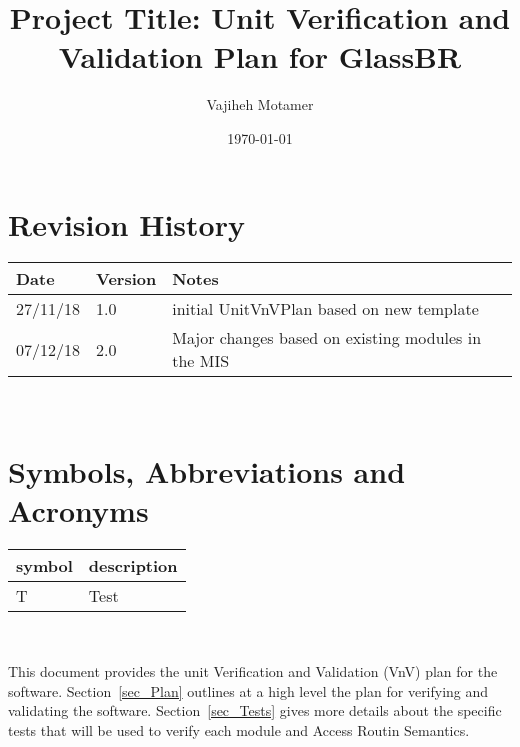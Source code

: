 \documentclass[12pt]{article}
\newcommand{\progname}{GlassBR}
\begin{document}
\title{Project Title: Unit Verification and Validation Plan for \progname{}} 
\author{Vajiheh Motamer}
\date{\today}
	
\maketitle


\section{Revision History}

\begin{tabularx}{\textwidth}{p{3cm}p{2cm}X}
\toprule {\bf Date} & {\bf Version} & {\bf Notes}\\
\midrule
27/11/18 & 1.0 & initial UnitVnVPlan based on new template\\
07/12/18 & 2.0 & Major changes based on existing modules in the MIS\\

\bottomrule
\end{tabularx}

~\newpage

\tableofcontents

\listoftables


\listoffigures


\newpage

\section{Symbols, Abbreviations and Acronyms}

\renewcommand{\arraystretch}{1.2}
\begin{tabular}{l l} 
  \toprule		
  \textbf{symbol} & \textbf{description}\\
  \midrule 
  T & Test\\
  \bottomrule
\end{tabular}\\


\newpage


This document provides the unit Verification and Validation (VnV) plan for the 
software. Section~\ref{sec_Plan} outlines at a high level the 
plan for verifying and validating the software. Section~\ref{sec_Tests} gives 
more details about the specific tests that will be used to verify each module and Access Routin Semantics.
\end{document}
